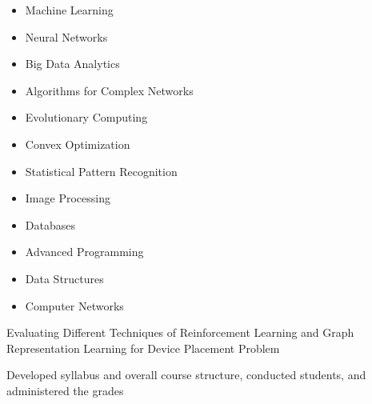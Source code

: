 \documentclass[10pt,a4paper,ragged2e,withhyper]{altacv}
\begin{document}
\vspace*{-1\multicolsep}
\begin{multicols}{3}
	\begin{itemize}
		\item Machine Learning
		\item Neural Networks
		\item Big Data Analytics
		\item  Algorithms for Complex Networks
		\item Evolutionary Computing
		\item Convex Optimization
		\item Statistical Pattern Recognition
		\item Image Processing
		\item Databases
		\item Advanced Programming
		\item Data Structures
		\item Computer Networks
	\end{itemize}
\end{multicols}

	Evaluating Different Techniques of Reinforcement Learning and Graph Representation Learning for Device Placement Problem




\vspace*{-.25\multicolsep}
Developed syllabus and overall course structure, conducted students, and administered the grades
\end{document}
